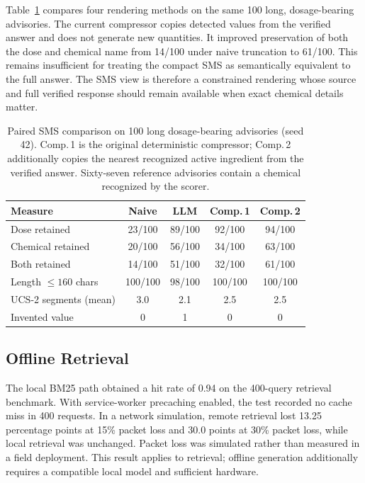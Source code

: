 \documentclass[11pt,a4paper]{article}
\begin{document}
Table~\ref{tab:n05c} compares four rendering methods on the same 100 long, dosage-bearing advisories. The current compressor copies detected values from the verified answer and does not generate new quantities. It improved preservation of both the dose and chemical name from 14/100 under naive truncation to 61/100. This remains insufficient for treating the compact SMS as semantically equivalent to the full answer. The SMS view is therefore a constrained rendering whose source and full verified response should remain available when exact chemical details matter.

\begin{table}[t]
\centering
\footnotesize
\setlength{\tabcolsep}{3pt}
\begin{tabularx}{\columnwidth}{@{}Xcccc@{}}
\toprule
\textbf{Measure} & \textbf{Naive} & \textbf{LLM} & \textbf{Comp.\,1} & \textbf{Comp.\,2} \\
\midrule
Dose retained & 23/100 & 89/100 & 92/100 & 94/100 \\
Chemical retained & 20/100 & 56/100 & 34/100 & 63/100 \\
Both retained & 14/100 & 51/100 & 32/100 & 61/100 \\
Length $\leq160$ chars & 100/100 & 98/100 & 100/100 & 100/100 \\
UCS-2 segments (mean) & 3.0 & 2.1 & 2.5 & 2.5 \\
Invented value & 0 & 1 & 0 & 0 \\
\bottomrule
\end{tabularx}
\caption{Paired SMS comparison on 100 long dosage-bearing advisories (seed 42). Comp.\,1 is the original deterministic compressor; Comp.\,2 additionally copies the nearest recognized active ingredient from the verified answer. Sixty-seven reference advisories contain a chemical recognized by the scorer.}
\label{tab:n05c}
\end{table}

\subsection{Offline Retrieval}
The local BM25 path obtained a hit rate of 0.94 on the 400-query retrieval benchmark. With service-worker precaching enabled, the test recorded no cache miss in 400 requests. In a network simulation, remote retrieval lost 13.25 percentage points at 15\% packet loss and 30.0 points at 30\% packet loss, while local retrieval was unchanged. Packet loss was simulated rather than measured in a field deployment. This result applies to retrieval; offline generation additionally requires a compatible local model and sufficient hardware.
\end{document}
